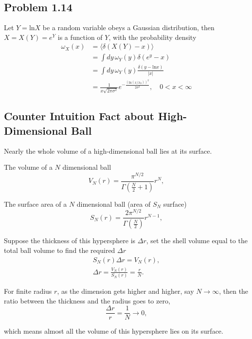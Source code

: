 \documentclass[10pt]{article}
\begin{document}
	\subsection{Problem 1.14}

	Let $Y = \mathrm{ln}X$ be a  random variable obeys a Gaussian distribution, then $X = X(Y) = e^{Y}$ is a function of $Y$, with the probability density
	\begin{align*}
		\omega_{X}(x) &= \langle \delta(X(Y) - x) \rangle \\
		&= \int dy \, \omega_Y(y) \delta(e^y - x) \\
		&= \int dy \, \omega_Y(y) \frac{\delta(y - \mathrm{ln}x)}{|x|} \\
		& = \frac{1}{x \sqrt{2\pi \sigma^2}} e^{-\frac{(\mathrm{ln}(x/x_0))^2}{2 \sigma^2}}, \quad 0<x<\infty
	\end{align*}


	\subsection{Counter Intuition Fact about High-Dimensional Ball}

	Nearly the whole volume of a high-dimensional ball lies at its surface.

	The volume of a $N$ dimensional ball
	\begin{equation}
		V_N(r) = \frac{\pi^{N/2}}{\Gamma(\frac{N}{2}+1)}r^N,
	\end{equation}

	The surface area of a $N$ dimensional ball (area of $S_N$ surface)
	\begin{equation}
		S_N(r) = \frac{2 \pi^{N/2}}{\Gamma(\frac{N}{2})}r^{N-1},
	\end{equation}

	Suppose the thickness of this hypersphere is $\Delta r$, set the shell volume equal to the total ball volume to find the required $\Delta r$
	\begin{align*}
		S_N(r) \Delta r = V_N(r), \\
		\Delta r = \frac{V_N(r)}{S_N(r)} = \frac{r}{N}.
	\end{align*}

	For finite radius $r$, as the dimension gets higher and higher, say $N \to \infty$, then the ratio between the thickness and the radius goes to zero,
	\begin{equation}
		\frac{\Delta r}{r} = \frac{1}{N} \to 0,
	\end{equation}

	which means almost all the volume of this hypersphere lies on its surface.
\end{document}
